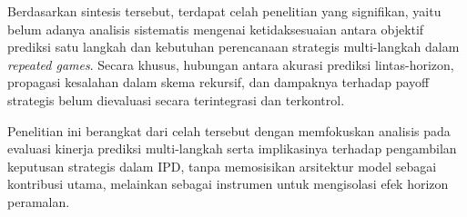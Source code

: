 Berdasarkan sintesis tersebut, terdapat celah penelitian yang signifikan, yaitu belum adanya analisis sistematis mengenai ketidaksesuaian antara objektif prediksi satu langkah dan kebutuhan perencanaan strategis multi-langkah dalam \textit{repeated games}. Secara khusus, hubungan antara akurasi prediksi lintas-horizon, propagasi kesalahan dalam skema rekursif, dan dampaknya terhadap payoff strategis belum dievaluasi secara terintegrasi dan terkontrol.

Penelitian ini berangkat dari celah tersebut dengan memfokuskan analisis pada evaluasi kinerja prediksi multi-langkah serta implikasinya terhadap pengambilan keputusan strategis dalam IPD, tanpa memosisikan arsitektur model sebagai kontribusi utama, melainkan sebagai instrumen untuk mengisolasi efek horizon peramalan.